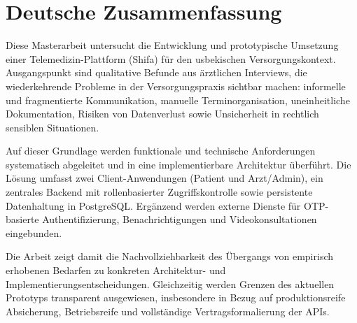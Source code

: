 \chapter*{Deutsche Zusammenfassung}

Diese Masterarbeit untersucht die Entwicklung und prototypische Umsetzung einer Telemedizin-Plattform (Shifa) für den usbekischen Versorgungskontext. Ausgangspunkt sind qualitative Befunde aus ärztlichen Interviews, die wiederkehrende Probleme in der Versorgungspraxis sichtbar machen: informelle und fragmentierte Kommunikation, manuelle Terminorganisation, uneinheitliche Dokumentation, Risiken von Datenverlust sowie Unsicherheit in rechtlich sensiblen Situationen.

Auf dieser Grundlage werden funktionale und technische Anforderungen systematisch abgeleitet und in eine implementierbare Architektur überführt. Die Lösung umfasst zwei Client-Anwendungen (Patient und Arzt/Admin), ein zentrales Backend mit rollenbasierter Zugriffskontrolle sowie persistente Datenhaltung in PostgreSQL. Ergänzend werden externe Dienste für OTP-basierte Authentifizierung, Benachrichtigungen und Videokonsultationen eingebunden.

Die Arbeit zeigt damit die Nachvollziehbarkeit des Übergangs von empirisch erhobenen Bedarfen zu konkreten Architektur- und Implementierungsentscheidungen. Gleichzeitig werden Grenzen des aktuellen Prototyps transparent ausgewiesen, insbesondere in Bezug auf produktionsreife Absicherung, Betriebsreife und vollständige Vertragsformalierung der APIs.
